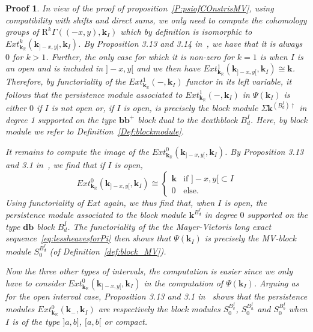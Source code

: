 \documentclass[a4paper, english, 11pt]{article}
\newcommand{\kk}[0]{\textbf{k}}
\newcommand{\0}{\vec{0}}
\newcommand{\R}[0]{\mathbb{R}}
\newcommand{\Rr}[0]{\text{R}}
\newtheorem*{pf}{Proof} }
\begin{document}
\begin{pf}
In view of the proof of proposition~\ref{P:psiofCOnstrisMV}, using compatibility with shifts and direct sums, we only need to compute the cohomology groups of $\Rr^k\Gamma \left ( (-x,y) , \kk_{I}\right )$ which by definition is isomorphic to 
$Ext^k_{\kk_\R}\left( \kk_{]-x,y[}, \kk_{I }\right) $. 
By Proposition 3.13 and 3.14 in~\cite{Berk18}, we have that it is always $0$ for $k>1$. Further, the only case for which it is non-zero for $k=1$ is when $I$ is an open and is included in $]-x,y[$ and we then have $Ext^1_{\kk_\R}\left( \kk_{]-x,y[}, \kk_{I }\right) \cong \kk $.  Therefore, by functoriality of the $Ext^1_{\kk_\R}( -, \kk_I)$ functor in its left variable, it follows that the persistence module associated to  
$Ext^1_{\kk_\R}( -, \kk_I)$ in $\Psi(\kk_I)$ is either $0$ if $I$ is not open or, if $I$ is open, is precisely the block module $\Sigma \kk^{(B_d^{I})\dag}$ in degree 1 supported on the type $\textbf{bb}^{+}$ block dual to the deathblock $B_d^{I}$. Here, by block module we refer to Definition~\ref{Def:blockmodule}.

It remains to compute the image of the $Ext^0_{\kk_\R}\left( \kk_{]-x,y[}, \kk_{I }\right) $. By Proposition 3.13 and 3.1 in~\cite{Berk18}, we find that if $I$ is open, 
$$Ext^0_{\kk_\R}\left( \kk_{]-x,y[}, \kk_{I }\right) \cong \left \{ \begin{array}{ll}
\kk & \mbox{if } ]-x, y[ \subset I \\ 0 & \mbox{else. }
\end{array}\right .$$
Using functoriality of $Ext$ again, we thus find that, when $I$ is open, the persistence module associated to  the block module $ \kk^{B_d^I}$ in degree $0$ supported on the type $\textbf{db}$ block $B_d^I$. 
The functoriality of the the Mayer-Vietoris long exact sequence~\eqref{eq:lessheavesforPi} then shows that $\Psi(\kk_I) $ is precisely the MV-block module $S_0^{B_d^I}$ (of Definition~\ref{def:block_MV}). 

Now the three other types of intervals, the computation is easier since we only have to consider $Ext^0_{\kk_\R}\left( \kk_{]-x,y[}, \kk_{I }\right)$ in the computation of $\Psi(\kk_I)$. Arguing as for the open interval case, Proposition 3.13 and 3.1 in~\cite{Berk18} shows that the persistence modules $Ext^0_{\kk_\R}\left( \kk_{-}, \kk_{I }\right)$ are respectively the block modules $S_0^{B_v^I}$, $S_0^{B_h^I}$ and 
$S_0^{B_b^I}$ when $I$ is of the type $]a, b]$, $[a, b[$ or compact. 
\end{pf}
\end{document}
